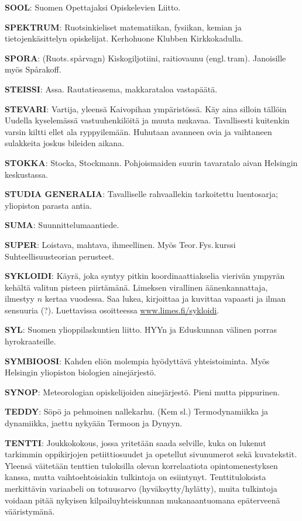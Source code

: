 \documentclass[../ala_hataile.tex]{subfiles}
\begin{document}
\textbf{SOOL}: Suomen Opettajaksi Opiskelevien
Liitto.

\textbf{SPEKTRUM}: Ruotsinkieliset matematiikan,
fysiikan, kemian ja tietojenkäsittelyn
opiskelijat. Kerhohuone Klubben Kirkkokadulla.

\textbf{SPORA}: (Ruots.\,spårvagn) Kiskogiljotiini,
raitiovaunu (engl.\,tram). Janoisille
myös Spårakoff.

\textbf{STEISSI}: Assa. Rautatieasema, makkarataloa
vastapäätä.

\textbf{STEVARI}: Vartija, yleensä Kaivopihan
ympäristössä. Käy aina silloin tällöin Uudella
kyselemässä vastuuhenkilöitä ja
muuta mukavaa. Tavallisesti kuitenkin varsin
kiltti ellet ala ryppyilemään. Huhutaan
avanneen ovia ja vaihtaneen sulakkeita joskus
bileiden aikana.

\textbf{STOKKA}: Stocka, Stockmann. Pohjoismaiden
suurin tavaratalo aivan Helsingin
keskustassa.

\textbf{STUDIA GENERALIA}: Tavalliselle rahvaallekin
tarkoitettu luentosarja; yliopiston
parasta antia.

\textbf{SUMA}: Suunnittelumaantiede.

\textbf{SUPER}: Loistava, mahtava, ihmeellinen.
Myös Teor.\,Fys.\,kurssi Suhteellisuusteorian
perusteet.

\textbf{SYKLOIDI}: Käyrä, joka syntyy pitkin
koordinaattiakselia vierivän ympyrän kehältä
valitun pisteen piirtämänä. Limeksen
virallinen äänenkannattaja, ilmestyy $n$ kertaa
vuodessa. Saa lukea, kirjoittaa ja kuvittaa
vapaasti ja ilman sensuuria (?). Luettavissa
osoitteessa \url{www.limes.fi/sykloidi}.

\textbf{SYL}: Suomen ylioppilaskuntien liitto.
HYYn ja Eduskunnan välinen porras hyrokraateille.

\textbf{SYMBIOOSI}: Kahden eliön molempia
hyödyttävä yhteistoiminta. Myös Helsingin
yliopiston biologien ainejärjestö.

\textbf{SYNOP}: Meteorologian opiskelijoiden ainejärjestö.
Pieni mutta pippurinen.

\textbf{TEDDY}: Söpö ja pehmoinen nallekarhu.
(Kem sl.) Termodynamiikka ja dynamiikka,
jaettu nykyään Termoon ja Dynyyn.

\textbf{TENTTI}: Joukkokokous, jossa yritetään
saada selville, kuka on lukenut tarkimmin
oppikirjojen petiitti\-osuudet ja opetellut
sivunumerot sekä kuvatekstit. Yleensä
väitetään tenttien tuloksilla olevan korrelaatiota
opinto\-menestyksen kanssa, mutta
vaihto\-ehtoisiakin tulkintoja on esiintynyt.
Tentti\-tuloksista merkittävin variaabeli on
totuusarvo (hyväksytty/hylätty), muita tulkintoja
voidaan pitää nykyisen kilpailu\-yhteis\-kunnan
mukanaan\-tuomana epä\-terveenä
vääristymänä.
\end{document}
